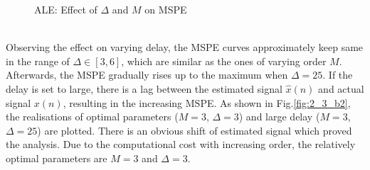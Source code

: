 \begin{figure}[htb]
\begin{subfigure}[b]{0.4\textwidth}
    \end{subfigure} 
    \caption{ALE: Effect of $\Delta$ and $M$ on MSPE}
    \label{fig:2_3_b1}
\end{figure}\\
Observing the effect on varying delay, the MSPE curves approximately keep same in the range of $\Delta\in[3,6]$, which are similar as the ones of varying order $M$. Afterwards, the MSPE gradually rises up to the maximum when $\Delta=25$. If the delay is set to large, there is a lag between the estimated signal $\hat x(n)$ and actual signal $x(n)$, resulting in the increasing MSPE. As shown in Fig.\ref{fig:2_3_b2}, the realisations of optimal parameters ($M=3$, $\Delta=3$) and large delay ($M=3$, $\Delta=25$) are plotted. There is an obvious shift of estimated signal which proved the analysis. Due to the computational cost with increasing order, the relatively optimal parameters are $M=3$ and $\Delta=3$.
